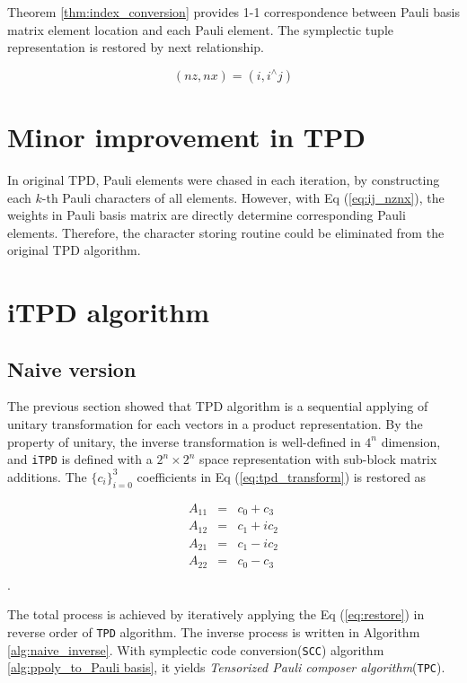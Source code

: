 \documentclass[twocolumn]{article}
\begin{document}
Theorem \ref{thm:index_conversion} provides 1-1 correspondence 
between Pauli basis matrix element location and each Pauli element.
The symplectic tuple representation is restored by next relationship.

\begin{equation}
    (nz, nx) = (i, i^\wedge j)
\end{equation}

\section{Minor improvement in TPD}

In original TPD, Pauli elements were chased in each iteration, 
by constructing each $k$-th Pauli characters of all elements.
However, with Eq (\ref{eq:ij_nznx}), the weights in Pauli basis matrix 
are directly determine corresponding Pauli elements.
Therefore, the character storing routine could be eliminated from the original TPD algorithm.

\section{iTPD algorithm}

\subsection{Naive version}

The previous section showed that TPD algorithm is a sequential 
applying of unitary transformation for each vectors in a product representation.
By the property of unitary, the inverse transformation is well-defined 
in $4^n$ dimension, and \texttt{iTPD} is defined with a $2^n \times 2^n$ space representation with 
sub-block matrix additions. 
The $\{c_i\}_{i=0}^3$ coefficients in Eq (\ref{eq:tpd_transform}) is restored as 

\begin{equation}
    \label{eq:restore}
    \begin{array}{ccc}
        A_{11} &=& c_0 + c_3\\
        A_{12} &=& c_1 + i c_2\\
        A_{21} &=& c_1 - i c_2\\
        A_{22} &=& c_0 - c_3\\
    \end{array}
\end{equation}.

The total process is achieved by iteratively applying the Eq (\ref{eq:restore}) in reverse order of \texttt{TPD} algorithm. 
The inverse process is written in Algorithm \ref{alg:naive_inverse}.
With symplectic code conversion(\texttt{SCC}) algorithm \ref{alg:ppoly_to_Pauli basis}, 
it yields \textit{Tensorized Pauli composer algorithm}(\texttt{TPC}).
\end{document}
